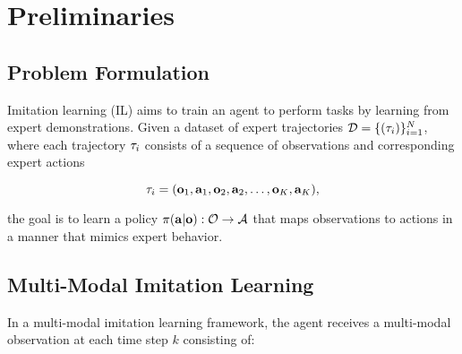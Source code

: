 \section{Preliminaries}
\label{sec:preliminaries}

\subsection{Problem Formulation}

Imitation learning (IL) aims to train an agent to perform tasks by learning from expert demonstrations. Given a dataset of expert trajectories \(\mathcal{D} = \{(\mathbf{\tau}_i)\}_{i=1}^{N}\), where each trajectory \(\mathbf{\tau}_i\) consists of a sequence of observations and corresponding expert actions

\begin{equation}
    \mathbf{\tau}_i = (\mathbf{o}_1, \mathbf{a}_1, \mathbf{o}_2, \mathbf{a}_2, \dots, \mathbf{o}_K, \mathbf{a}_K),
\end{equation}

the goal is to learn a policy \(\pi(\mathbf{a}|\mathbf{o}): \mathcal{O} \to \mathcal{A}\) that maps observations to actions in a manner that mimics expert behavior.





\subsection{Multi-Modal Imitation Learning}
In a multi-modal imitation learning framework, the agent receives a multi-modal observation at each time step \(k\) consisting of:

